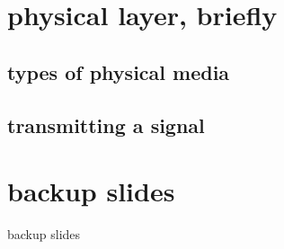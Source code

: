 \date{}
\title{}
\date{}

\begin{frame}
    \titlepage
\end{frame}

\section{physical layer, briefly}

\subsection{types of physical media}


\subsection{transmitting a signal}


\section{backup slides}
\begin{frame}{backup slides}
\end{frame}


